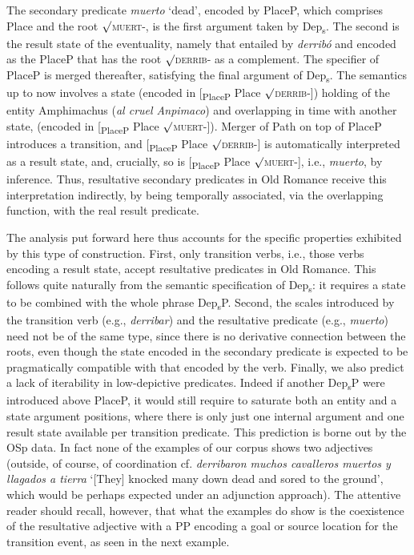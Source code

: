 \documentclass[output=paper,colorlinks,citecolor=brown,
]{langscibook}
\begin{document}
\noindent The secondary predicate \textit{muerto} `dead’, encoded by PlaceP, which comprises Place and the root $\surd$\textsc{\textsc{muert}-}, is the first argument taken by Dep\textsubscript{s}. The second is the result state of the eventuality, namely that entailed by \textit{derribó} and encoded as the PlaceP that has the root $\surd$\textsc{\textsc{derrib}-} as a complement. The specifier of PlaceP is merged thereafter, satisfying the final argument of Dep\textsubscript{s}. The semantics up to now involves a state (encoded in [\textsubscript{PlaceP} Place $\surd$\textsc{derrib}-]) holding of the entity Amphimachus (\textit{al cruel Anpimaco}) and overlapping in time with another state, (encoded in [\textsubscript{PlaceP} Place $\surd$\textsc{\textsc{muert}-}]). Merger of Path on top of PlaceP introduces a transition, and [\textsubscript{PlaceP} Place $\surd$\textsc{\textsc{derrib}-}] is automatically interpreted as a result state, and, crucially, so is [\textsubscript{PlaceP} Place $\surd$\textsc{\textsc{muert}-}], i.e., \textit{muerto}, by inference. Thus, resultative secondary predicates in Old Romance receive this interpretation indirectly, by being temporally associated, via the overlapping function, with the real result predicate. 

The analysis put forward here thus accounts for the specific properties exhibited by this type of construction. First, only transition verbs, i.e., those verbs encoding a result state, accept resultative predicates in Old Romance. This follows quite naturally from the semantic specification of Dep\textsubscript{s}: it requires a state to be combined with the whole phrase Dep\textsubscript{s}P. Second, the scales introduced by the transition verb (e.g., \textit{derribar}) and the resultative predicate (e.g., \textit{muerto}) need not be of the same type, since there is no derivative connection between the roots, even though the state encoded in the secondary predicate is expected to be pragmatically compatible with that encoded by the verb. Finally, we also predict a lack of iterability in low-depictive predicates. Indeed if another Dep\textsubscript{s}P were introduced above PlaceP, it would still require to saturate both an entity and a state argument positions, where there is only just one internal argument and one result state available per transition predicate. This prediction is borne out by the OSp data. In fact none of the examples of our corpus shows two adjectives (outside, of course, of coordination cf. \textit{derribaron muchos cavalleros muertos y llagados a tierra} `[They] knocked many down dead and sored to the ground’, which would be perhaps expected under an adjunction approach). The attentive reader should recall, however, that what the examples do show is the coexistence of the resultative adjective with a PP encoding a goal or source location for the transition event, as seen in the next example.
\end{document}
